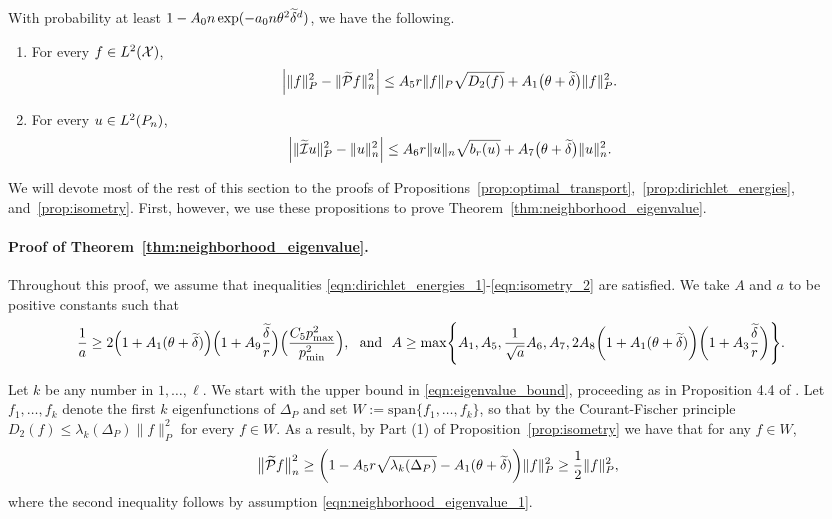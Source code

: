 \begin{proposition}
	\label{prop:isometry}
	With probability at least $1 - A_0n\exp(-a_0n\theta^2\widetilde{\delta}^{d})$, we have the following.
	\begin{enumerate}[(1)]
		\item For every $f \in L^2(\mathcal{X})$,
		\begin{equation}
		\label{eqn:isometry_1}
		\Bigl|\|f\|_{P}^2 - \|\widetilde{\mathcal{P}}f\|_{n}^2\Bigr| \leq A_5 r \|f\|_{P} \sqrt{D_2(f)} + A_1\bigl(\theta + \widetilde{\delta}\bigr)\|f\|_{P}^2.
		\end{equation}
		\item For every $u \in L^2(P_n)$,
		\begin{equation}
		\label{eqn:isometry_2}
		\Bigl|\|\widetilde{\mathcal{I}}u\|_{P}^2 - \|u\|_{n}^2\Bigr| \leq A_6 r \|u\|_{n} \sqrt{b_r(u)} + A_7\bigl(\theta + \widetilde{\delta}\bigr) \|u\|_{n}^2.
		\end{equation}
	\end{enumerate}
\end{proposition}

We will devote most of the rest of this section to the proofs of Propositions~\ref{prop:optimal_transport},~\ref{prop:dirichlet_energies}, and~\ref{prop:isometry}. First, however, we use these propositions to prove Theorem~\ref{thm:neighborhood_eigenvalue}.

\paragraph{Proof of Theorem~\ref{thm:neighborhood_eigenvalue}.}
Throughout this proof, we assume that inequalities \eqref{eqn:dirichlet_energies_1}-\eqref{eqn:isometry_2} are satisfied. We take $A$ and $a$ to be positive constants such that
\begin{align*}
\frac{1}{a} & \geq 2\Bigl(1 + A_1(\theta + \widetilde{\delta})\Bigr)\Bigl(1 + A_9\frac{\widetilde{\delta}}{r}\Bigr)\Bigl(\frac{C_5 p_{\max}^2}{p_{\min}^2}\Bigr) ,~~\textrm{and}~~A \geq \max\Biggl\{A_1,A_5, \frac{1}{\sqrt{a}}A_6, A_7, 2A_8\biggl(1 + A_1(\theta + \widetilde{\delta})\biggr) \biggl(1 + A_3\frac{\widetilde{\delta}}{r}\biggr) \Biggr\}.
\end{align*}

Let $k$ be any number in $1,\ldots,\ell$. We start with the upper bound in \eqref{eqn:eigenvalue_bound}, proceeding as in Proposition 4.4 of \citet{burago2014}. Let $f_1,\ldots,f_{k}$ denote the first $k$ eigenfunctions of $\Delta_P$ and set $W := \mathrm{span}\{f_1,\ldots,f_k\}$, so that by the Courant-Fischer principle $D_2(f) \leq \lambda_k(\Delta_P) \|f\|_{P}^2$ for every $f \in W$. As a result, by Part (1) of Proposition~\ref{prop:isometry} we have that for any $f \in W$,
\begin{equation*}
\bigl\|\widetilde{\mathcal{P}}f\bigr\|_{n}^2 \geq \biggl(1 - A_5r \sqrt{\lambda_{k}(\Delta_P)} - A_1(\theta + \widetilde{\delta})\biggr)\|f\|_{P}^2  \geq \frac{1}{2} \|f\|_{P}^2,
\end{equation*}
where the second inequality follows by assumption \eqref{eqn:neighborhood_eigenvalue_1}. 

